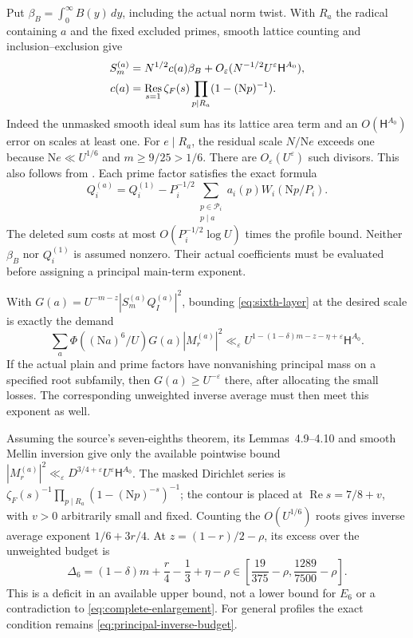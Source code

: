 \documentclass[11pt]{article}
\theoremstyle{definition}
\theoremstyle{remark}
\numberwithin{equation}{section}
\newcommand{\Nm}{\mathrm N}
\newcommand{\HH}{\mathsf H}
\newcommand{\Rea}{\operatorname{Re}}
\newcommand{\ee}{\varepsilon}
\begin{document}
Put $\beta_B=\int_0^\infty B(y)\,dy$, including the actual norm
twist. With $R_a$ the radical containing $a$ and the fixed excluded
primes, smooth lattice counting and inclusion--exclusion give
\begin{align}
S_m^{(a)}&=N^{1/2}c(a)\beta_B
 +O_\ee(N^{-1/2}U^\ee\HH^{A_0}),\label{eq:principal-plain}\\
c(a)&=\mathop{\rm Res}_{s=1}\zeta_F(s)
 \prod_{p\mid R_a}(1-(\Nm p)^{-1}).\nonumber
\end{align}
Indeed the unmasked smooth ideal sum has its lattice area term and
an $O(\HH^{A_0})$ error on scales at least one. For $e\mid R_a$,
the residual scale $N/\Nm e$ exceeds one because
$\Nm e\ll U^{1/6}$ and $m\ge9/25>1/6$.
There are $O_\ee(U^\ee)$ such divisors. This also follows from
\cite[Lemma 18.3]{openai}. Each prime factor satisfies the exact formula
\begin{equation}\label{eq:principal-prime}
Q_i^{(a)}=Q_i^{(1)}-P_i^{-1/2}
 \sum_{\substack{p\in\mathcal P_i\\p\mid a}}
 a_i(p)W_i(\Nm p/P_i).
\end{equation}
The deleted sum costs at most $O(P_i^{-1/2}\log U)$ times the
profile bound. Neither $\beta_B$ nor $Q_i^{(1)}$ is assumed nonzero.
Their actual coefficients must be evaluated before assigning a
principal main-term exponent.

With $G(a)=U^{-m-z}|S_m^{(a)}Q_I^{(a)}|^2$, bounding
\eqref{eq:sixth-layer} at the desired scale is exactly the demand
\begin{equation}\label{eq:principal-inverse-budget}
\sum_a\Phi((\Nm a)^6/U)G(a)|M_r^{(a)}|^2
\ll_\ee U^{1-(1-\delta)m-z-\eta+\ee}\HH^{A_0}.
\end{equation}
If the actual plain and prime factors have nonvanishing principal
mass on a specified root subfamily, then $G(a)\ge U^{-\ee}$ there,
after allocating the small losses. The corresponding unweighted
inverse average must then meet this exponent as well.

Assuming the source's seven-eighths theorem, its
Lemmas~4.9--4.10 and smooth Mellin inversion give only the available
pointwise bound $|M_r^{(a)}|^2\ll_\ee D^{3/4+\ee}U^\ee\HH^{A_0}$.
The masked Dirichlet series is
$\zeta_F(s)^{-1}\prod_{p\mid R_a}(1-(\Nm p)^{-s})^{-1}$;
the contour is placed at $\Rea s=7/8+v$, with $v>0$ arbitrarily
small and fixed. Counting the $O(U^{1/6})$ roots gives inverse
average exponent $1/6+3r/4$. At $z=(1-r)/2-\rho$, its excess over
the unweighted budget is
\begin{equation}\label{eq:sixth-budget-gap}
\Delta_6=(1-\delta)m+\frac r4-\frac13+\eta-\rho
\in\left[\frac{19}{375}-\rho,\frac{1289}{7500}-\rho\right].
\end{equation}
This is a deficit in an available upper bound, not a lower bound
for $E_6$ or a contradiction to \eqref{eq:complete-enlargement}.
For general profiles the exact condition remains
\eqref{eq:principal-inverse-budget}.
\end{document}
